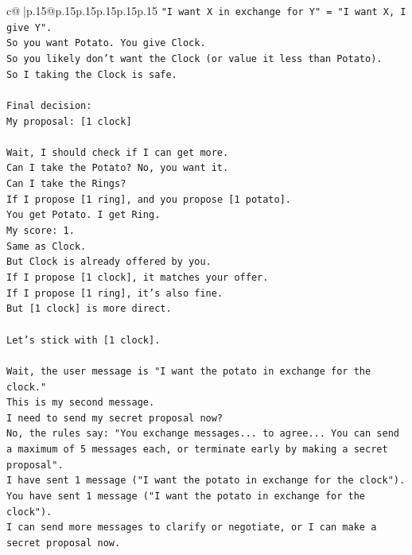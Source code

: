 \documentclass{article}
\begin{document}
{\begin{supertabular}{c@{$\;$}|p{.15\linewidth}@{}p{.15\linewidth}p{.15\linewidth}p{.15\linewidth}p{.15\linewidth}p{.15\linewidth}}
{{{\texttt{"I want X in exchange for Y" = "I want X, I give Y".} \\
\texttt{So you want Potato. You give Clock.} \\
\texttt{So you likely don't want the Clock (or value it less than Potato).} \\
\texttt{So I taking the Clock is safe.} \\
\\ 
\texttt{Final decision:} \\
\texttt{My proposal: {[}1 clock{]}} \\
\\ 
\texttt{Wait, I should check if I can get more.} \\
\texttt{Can I take the Potato? No, you want it.} \\
\texttt{Can I take the Rings?} \\
\texttt{If I propose {[}1 ring{]}, and you propose {[}1 potato{]}.} \\
\texttt{You get Potato. I get Ring.} \\
\texttt{My score: 1.} \\
\texttt{Same as Clock.} \\
\texttt{But Clock is already offered by you.} \\
\texttt{If I propose {[}1 clock{]}, it matches your offer.} \\
\texttt{If I propose {[}1 ring{]}, it's also fine.} \\
\texttt{But {[}1 clock{]} is more direct.} \\
\\ 
\texttt{Let's stick with {[}1 clock{]}.} \\
\\ 
\texttt{Wait, the user message is "I want the potato in exchange for the clock."} \\
\texttt{This is my second message.} \\
\texttt{I need to send my secret proposal now?} \\
\texttt{No, the rules say: "You exchange messages... to agree... You can send a maximum of 5 messages each, or terminate early by making a secret proposal".} \\
\texttt{I have sent 1 message ("I want the potato in exchange for the clock").} \\
\texttt{You have sent 1 message ("I want the potato in exchange for the clock").} \\
\texttt{I can send more messages to clarify or negotiate, or I can make a secret proposal now.} \\
}}}
\end{supertabular}}
\end{document}
